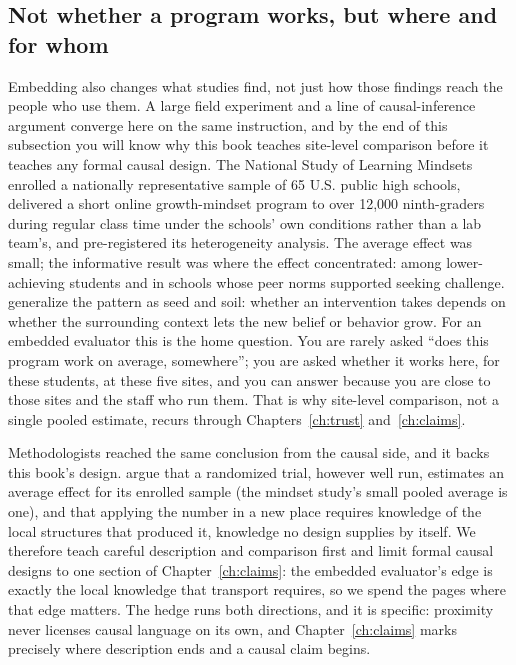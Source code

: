 \documentclass[
    a4paper,
    fontsize=10pt,
    twoside=true,
    numbers=noenddot,
]{kaobook}
\begin{document}
\subsection{Not whether a program works, but where and for whom}\label{sec:ch01-home-question}
Embedding also changes what studies find, not just how those findings reach the people who use them. A large field experiment and a line of causal-inference argument converge here on the same instruction, and by the end of this subsection you will know why this book teaches site-level comparison before it teaches any formal causal design. The National Study of Learning Mindsets \parencite{yeager2019mindset} enrolled a nationally representative sample of 65 U.S. public high schools, delivered a short online growth-mindset program to over 12,000 ninth-graders during regular class time under the schools' own conditions rather than a lab team's, and pre-registered its heterogeneity analysis. The average effect was small; the informative result was where the effect concentrated: among lower-achieving students and in schools whose peer norms supported seeking challenge. \textcite{walton2020seed} generalize the pattern as seed and soil: whether an intervention takes depends on whether the surrounding context lets the new belief or behavior grow. For an embedded evaluator this is the home question. You are rarely asked \enquote{does this program work on average, somewhere}; you are asked whether it works here, for these students, at these five sites, and you can answer because you are close to those sites and the staff who run them. That is why site-level comparison, not a single pooled estimate, recurs through Chapters~\ref{ch:trust} and~\ref{ch:claims}.

Methodologists reached the same conclusion from the causal side, and it backs this book's design. \textcite{deaton2018rcts} argue that a randomized trial, however well run, estimates an average effect for its enrolled sample (the mindset study's small pooled average is one), and that applying the number in a new place requires knowledge of the local structures that produced it, knowledge no design supplies by itself. We therefore teach careful description and comparison first and limit formal causal designs to one section of Chapter~\ref{ch:claims}: the embedded evaluator's edge is exactly the local knowledge that transport requires, so we spend the pages where that edge matters. The hedge runs both directions, and it is specific: proximity never licenses causal language on its own, and Chapter~\ref{ch:claims} marks precisely where description ends and a causal claim begins.
\end{document}
